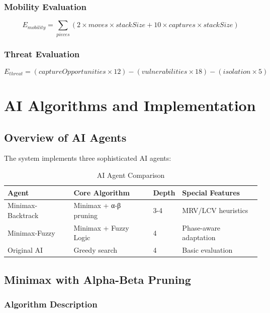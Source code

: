 \documentclass[12pt,a4paper]{article}
\begin{document}
\subsubsection{Mobility Evaluation}
\begin{equation}
E_{mobility} = \sum_{pieces} (2 \times moves \times stackSize + 10 \times captures \times stackSize)
\end{equation}

\subsubsection{Threat Evaluation}
\begin{equation}
E_{threat} = (captureOpportunities \times 12) - (vulnerabilities \times 18) - (isolation \times 5)
\end{equation}

\section{AI Algorithms and Implementation}

\subsection{Overview of AI Agents}

The system implements three sophisticated AI agents:

\begin{table}[H]
\centering
\caption{AI Agent Comparison}
\begin{tabular}{@{}llll@{}}
\toprule
\textbf{Agent} & \textbf{Core Algorithm} & \textbf{Depth} & \textbf{Special Features} \\ 
\midrule
Minimax-Backtrack & Minimax + α-β pruning & 3-4 & MRV/LCV heuristics \\
Minimax-Fuzzy & Minimax + Fuzzy Logic & 4 & Phase-aware adaptation \\
Original AI & Greedy search & 4 & Basic evaluation \\
\bottomrule
\end{tabular}
\end{table}

\subsection{Minimax with Alpha-Beta Pruning}

\subsubsection{Algorithm Description}
\end{document}

